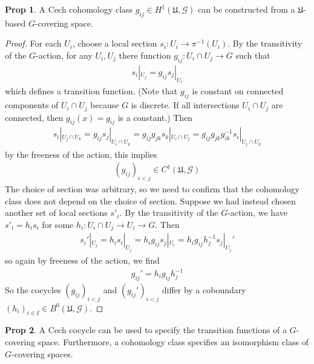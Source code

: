 \documentclass[11pt]{article}
\theoremstyle{definition}
\newtheorem{prop}{Prop}
\begin{document}
\begin{prop}
  A Cech cohomology class $g_{ij} \in H^1(\mathfrak U, \mathcal G)$ can be
  constructed from a $\mathfrak U$-based $G$-covering space.
\end{prop}

\begin{proof}
For each $U_i$, choose a local section $s_i: U_i \to \pi^{-1}(U_i)$. By the
transitivity of the $G$-action, for any $U_i,U_j$ there function $g_{ij}:U_i \cap
U_j \to G$ such that
\begin{align}
s_i|_{U_j} = g_{ij}s_j|_{U_i}
\end{align}
which defines a transition function.
(Note that $g_{ij}$ is constant on connected components of $U_i \cap U_j$
because $G$ is discrete. If all intersections $U_i \cap U_j$ are connected, then
$g_{ij}(x) = g_{ij}$ is a constant.)
Then
\begin{align}
  s_{i}|_{U_j \cap U_k} = g_{ij}s_j|_{U_i \cap U_k} = g_{ij}g_{jk}s_k|_{U_i \cap U_j} = g_{ij}g_{jk}g_{ik}^{-1}s_i|_{U_j \cap U_k}
\end{align}
by the freeness of the action, this implies
\begin{align}
  (g_{ij})_{i < j} \in C^1(\mathfrak U, \mathcal G)
\end{align}
The choice of section was arbitrary, so we need to confirm that the cohomology
class does not depend on the choice of section. Suppose we had instead chosen
another set of local sections $s'_i$. By the transitivity of the $G$-action, we
have $s'_i = h_i s_i$ for some $h_i :U_i \cap
U_j \to U_i \to G$. Then 
\begin{align}
s_i'|_{U_j} = h_i s_i|_{U_j} = h_i g_{ij} s_j|_{U_i} = h_i g_{ij} h_j^{-1} s_{j}|_{U_j}'
\end{align}
so again by freeness of the action, we find
\begin{align}
g_{ij}' = h_i g_{ij} h_j^{-1}
\end{align}
So the cocycles $(g_{ij})_{i < j}$ and $(g_{ij}')_{i < j}$ differ by a
coboundary $(h_i)_{i \in I} \in B^0(\mathfrak U, \mathcal G)$.
\end{proof}

\begin{prop}
  A Cech cocycle can be used to specify the transition functions of a
  $G$-covering space. Furthermore, a cohomology class specifies an isomorphism
  class of $G$-covering spaces.
\end{prop}
\end{document}
